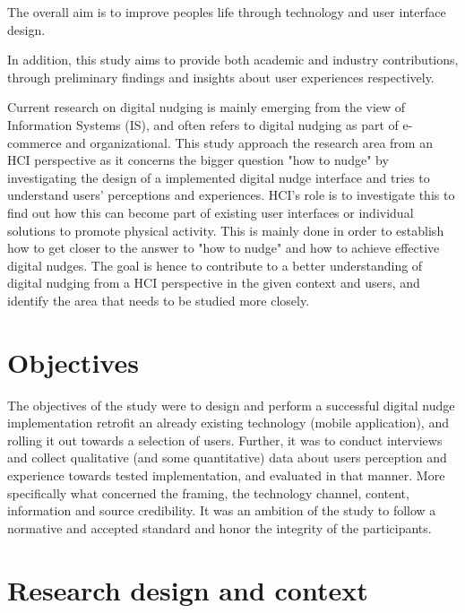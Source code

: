 The overall aim is to improve peoples life through technology and user interface design. 

In addition, this study aims to provide both academic and industry contributions, through preliminary findings and insights about user experiences respectively. 


Current research on digital nudging is mainly emerging from the view of Information Systems (IS), and often refers to digital nudging as part of e-commerce and organizational. This study approach the research area from an HCI perspective as it concerns the bigger question "how to nudge" by investigating the design of a implemented digital nudge interface and tries to understand users' perceptions and experiences. HCI's role is to investigate this to find out how this can become part of existing user interfaces or individual solutions to promote physical activity. This is mainly done in order to establish how to get closer to the answer to "how to nudge" and how to achieve effective digital nudges. The goal is hence to contribute to a better understanding of digital nudging from a HCI perspective in the given context and users, and identify the area that needs to be studied more closely. 

\section{Objectives}
The objectives of the study were to design and perform a successful digital nudge implementation retrofit an already existing technology (mobile application), and rolling it out towards a selection of users.
Further, it was to conduct interviews and collect qualitative (and some quantitative) data about users perception and experience towards tested implementation, and evaluated in that manner. More specifically what concerned the framing, the technology channel, content, information and source credibility. It was an ambition of the study to follow a normative and accepted standard and honor the integrity of the participants. 

\section{Research design and context}
